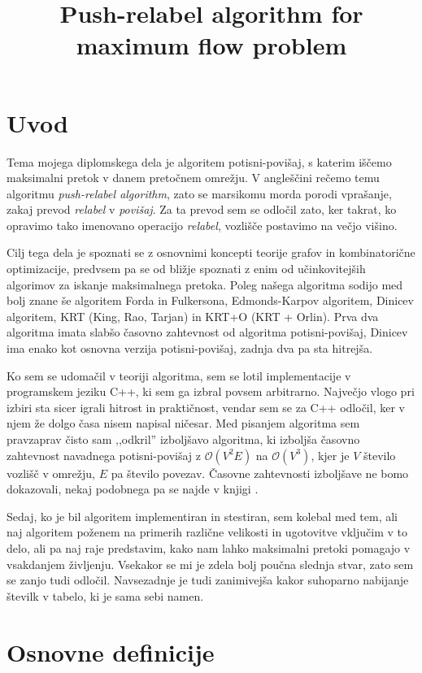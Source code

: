 \documentclass[mat1]{fmfdelo}
\title{Push-relabel algorithm for maximum flow problem}
\begin{document}
\section{Uvod}

Tema mojega diplomskega dela je algoritem potisni-povišaj, s katerim iščemo maksimalni pretok v danem pretočnem omrežju. V angleščini rečemo temu algoritmu \textit{push-relabel algorithm}, zato se marsikomu morda porodi vprašanje,
zakaj prevod \textit{relabel} v \textit{povišaj}. Za ta prevod sem se odločil zato, ker takrat, ko opravimo tako imenovano operacijo \textit{relabel}, vozlišče postavimo na večjo višino.

Cilj tega dela je spoznati se z osnovnimi koncepti teorije grafov in kombinatorične optimizacije, predvsem pa se od bližje spoznati z enim od učinkovitejših algorimov za iskanje maksimalnega pretoka. Poleg našega algoritma
sodijo med bolj znane še algoritem Forda in Fulkersona, Edmonds-Karpov algoritem, Dinicev algoritem, KRT (King, Rao, Tarjan) in KRT+O (KRT + Orlin). Prva dva algoritma imata slabšo časovno zahtevnost od algoritma potisni-povišaj,
Dinicev ima enako kot osnovna verzija potisni-povišaj, zadnja dva pa sta hitrejša.

Ko sem se udomačil v teoriji algoritma, sem se lotil implementacije v programskem jeziku C++, ki sem ga izbral povsem arbitrarno. Največjo vlogo pri izbiri sta sicer igrali hitrost in praktičnost, vendar sem se za C++ odločil, ker v njem
že dolgo časa nisem napisal ničesar. Med pisanjem algoritma sem pravzaprav čisto sam ,,odkril'' izboljšavo algoritma, ki izboljša časovno zahtevnost navadnega potisni-povišaj z $\mathcal{O}(V^2E)$ na $\mathcal{O}(V^3)$, kjer je $V$ število vozlišč
v omrežju, $E$ pa število povezav. Časovne zahtevnosti izboljšave ne bomo dokazovali, nekaj podobnega pa se najde v knjigi \cite{clrs}.

Sedaj, ko je bil algoritem implementiran in stestiran, sem kolebal med tem, ali naj algoritem poženem na primerih različne velikosti in ugotovitve vključim v to delo, ali pa naj raje predstavim, kako nam lahko maksimalni pretoki pomagajo
v vsakdanjem življenju. Vsekakor se mi je zdela bolj poučna slednja stvar, zato sem se zanjo tudi odločil. Navsezadnje je tudi zanimivejša kakor suhoparno nabijanje številk v tabelo, ki je sama sebi namen.

\section{Osnovne definicije}
\end{document}
